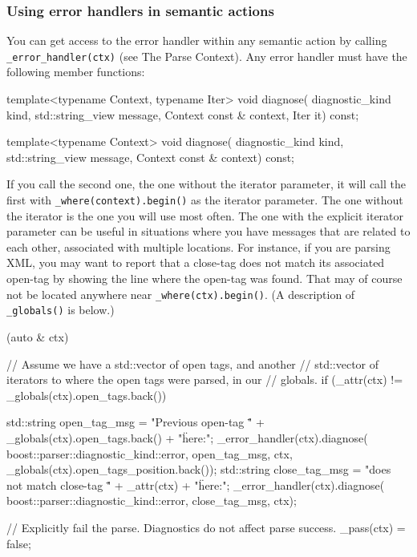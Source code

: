 \subsubsection{Using error handlers in semantic actions}

You can get access to the error handler within any semantic action by calling \texttt{\_error\_handler(ctx)} (see The Parse Context). Any error handler must have the following member functions:

\begin{code}
template<typename Context, typename Iter>
void diagnose(
    diagnostic_kind kind,
    std::string_view message,
    Context const & context,
    Iter it) const;
\end{code}

\begin{code}
template<typename Context>
void diagnose(
    diagnostic_kind kind,
    std::string_view message,
    Context const & context) const;
\end{code}

If you call the second one, the one without the iterator parameter, it will call the first with \texttt{\_where(context).begin()} as the iterator parameter. The one without the iterator is the one you will use most often. The one with the explicit iterator parameter can be useful in situations where you have messages that are related to each other, associated with multiple locations. For instance, if you are parsing XML, you may want to report that a close-tag does not match its associated open-tag by showing the line where the open-tag was found. That may of course not be located anywhere near \texttt{\_where(ctx).begin()}. (A description of \texttt{\_globals()} is below.)

\begin{code}
[](auto & ctx) {
    // Assume we have a std::vector of open tags, and another
    // std::vector of iterators to where the open tags were parsed, in our
    // globals.
    if (_attr(ctx) != _globals(ctx).open_tags.back()) {
        std::string open_tag_msg =
            "Previous open-tag \"" + _globals(ctx).open_tags.back() + "\" here:";
        _error_handler(ctx).diagnose(
            boost::parser::diagnostic_kind::error,
            open_tag_msg,
            ctx,
            _globals(ctx).open_tags_position.back());
        std::string close_tag_msg =
            "does not match close-tag \"" + _attr(ctx) + "\" here:";
        _error_handler(ctx).diagnose(
            boost::parser::diagnostic_kind::error,
            close_tag_msg,
            ctx);

        // Explicitly fail the parse.  Diagnostics do not affect parse success.
        _pass(ctx) = false;
    }
}
\end{code}

